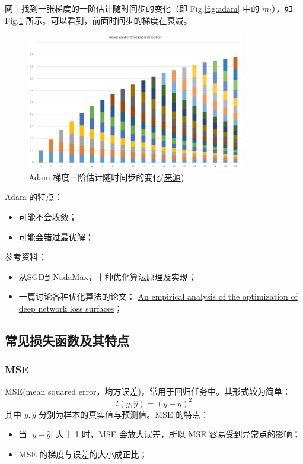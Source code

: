 网上找到一张梯度的一阶估计随时间步的变化（即 Fig.\ref{fig:adam} 中的 $m_t$），如 Fig.\ref{fig:adam-gradient} 所示。可以看到，前面时间步的梯度在衰减。
\begin{figure}[h]
	\centering
	\includegraphics[width=0.85\textwidth]{pics/adam-gradient-weight-distribution.png}
	\caption{Adam 梯度一阶估计随时间步的变化(\href{https://www.jianshu.com/p/aebcaf8af76e}{来源})}
	\label{fig:adam-gradient}
\end{figure}

Adam 的特点：
\begin{itemize}
	\item 可能不会收敛；
	
	\item 可能会错过最优解；
\end{itemize}

参考资料：
\begin{itemize}
	\item \href{https://mp.weixin.qq.com/s/L9jCK5rtyq3fJZEBpLvagg}{从SGD到NadaMax，十种优化算法原理及实现}；
	
	\item 一篇讨论各种优化算法的论文： \href{https://arxiv.org/pdf/1612.04010.pdf}{An empirical analysis of the optimization of deep network loss surfaces}；
\end{itemize}

\subsection{常见损失函数及其特点}
\subsubsection{MSE}
MSE(mean squared error，均方误差)，常用于回归任务中。其形式较为简单：
$$
l(y, \hat{y}) = (y - \hat{y})^2
$$
其中 $y, \hat{y}$ 分别为样本的真实值与预测值。MSE 的特点：
\begin{itemize}
	\item 当 $|y - \hat{y}|$ 大于 1 时，MSE 会放大误差，所以 MSE 容易受到异常点的影响；
	
	\item MSE 的梯度与误差的大小成正比；
\end{itemize}

